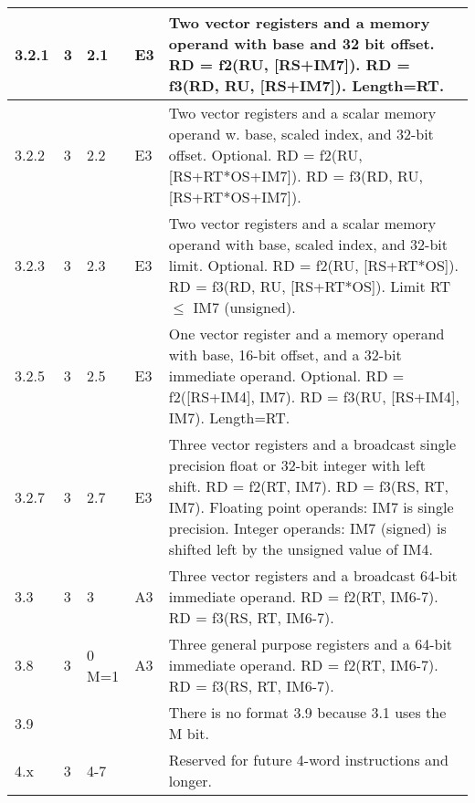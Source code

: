 \documentclass[forwardcom.tex]{subfiles}
\begin{document}
\begin{longtable} {|p{10mm}|p{6mm}|p{9mm}|p{7mm}|p{80mm}|}
\hline
3.2.1 & 3 & 2.1 & E3 & Two vector registers and a memory operand with base and 32 bit offset.\newline 
RD = f2(RU, [RS+IM7]). \newline 
RD = f3(RD, RU, [RS+IM7]). \newline 
Length=RT.\\

\hline
3.2.2 & 3 & 2.2 & E3 & Two vector registers and a scalar memory operand w. base, scaled index, and 32-bit offset. Optional. \newline 
RD = f2(RU, [RS+RT*OS+IM7]). \newline 
RD = f3(RD, RU, [RS+RT*OS+IM7]).\\

\hline
3.2.3 & 3 & 2.3 & E3 & Two vector registers and a scalar memory operand with base, scaled index, and 32-bit limit. Optional. \newline 
RD = f2(RU, [RS+RT*OS]). \newline 
RD = f3(RD, RU, [RS+RT*OS]). \newline 
Limit RT $\leq$ IM7 (unsigned).\\

\hline
3.2.5 & 3 & 2.5  & E3 & One vector register and a memory operand with base, 16-bit offset, and a 32-bit immediate operand. Optional. \newline 
RD = f2([RS+IM4], IM7). \newline 
RD = f3(RU, [RS+IM4], IM7). \newline 
Length=RT.\\

\hline
3.2.7 & 3 & 2.7 & E3 & Three vector registers and a broadcast single precision float or 32-bit integer with left shift.\newline 
RD = f2(RT, IM7). \newline 
RD = f3(RS, RT, IM7).\newline
Floating point operands: IM7 is single precision.
Integer operands: IM7 (signed) is shifted left by the unsigned value of IM4. \\

\hline
3.3 & 3 & 3 & A3 & Three vector registers and a broadcast 64-bit immediate operand.\newline 
RD = f2(RT, IM6-7). \newline 
RD = f3(RS, RT, IM6-7).\\

\hline
3.8 & 3 & 0 M=1 & A3 & Three general purpose registers and a 64-bit immediate operand. \newline 
RD = f2(RT, IM6-7). \newline 
RD = f3(RS, RT, IM6-7).\\

\hline
3.9 &  &  &  & There is no format 3.9 because 3.1 uses the M bit.\\

\hline
4.x & 3 & 4-7 &  & Reserved for future 4-word instructions and longer. \\
\hline
\end{longtable}
\end{document}

